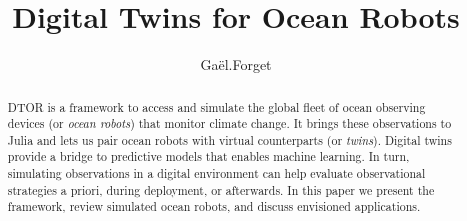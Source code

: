 \documentclass{juliacon}[12pt]
\begin{document}
\title{Digital Twins for Ocean Robots}

\author[1]{Gaël.Forget}



\maketitle

\begin{abstract}

DTOR is a framework to access and simulate the global fleet of ocean observing devices (or {\it ocean robots}) that monitor climate change. It brings these observations to Julia and lets us pair ocean robots with virtual counterparts (or {\it twins}). Digital twins provide a bridge to predictive models that enables machine learning. In turn, simulating observations in a digital environment can help evaluate observational strategies a priori, during deployment, or afterwards. In this paper we present the framework, review simulated ocean robots, and discuss envisioned applications. 


\end{abstract}
\end{document}
